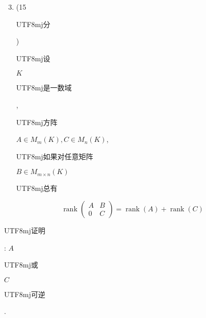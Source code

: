 \documentclass[10pt]{article}
\begin{document}
\begin{enumerate}
  \setcounter{enumi}{2}
  \item (15 \begin{CJK}{UTF8}{mj}分\end{CJK}) \begin{CJK}{UTF8}{mj}设\end{CJK} $K$ \begin{CJK}{UTF8}{mj}是一数域\end{CJK}, \begin{CJK}{UTF8}{mj}方阵\end{CJK} $A \in M_{m}(K), C \in M_{n}(K)$, \begin{CJK}{UTF8}{mj}如果对任意矩阵\end{CJK} $B \in M_{m \times n}(K)$ \begin{CJK}{UTF8}{mj}总有\end{CJK}
\end{enumerate}
$$
\operatorname{rank}\left(\begin{array}{cc}
A & B \\
0 & C
\end{array}\right)=\operatorname{rank}(A)+\operatorname{rank}(C)
$$
\begin{CJK}{UTF8}{mj}证明\end{CJK}: $A$ \begin{CJK}{UTF8}{mj}或\end{CJK} $C$ \begin{CJK}{UTF8}{mj}可逆\end{CJK}.
\end{document}
